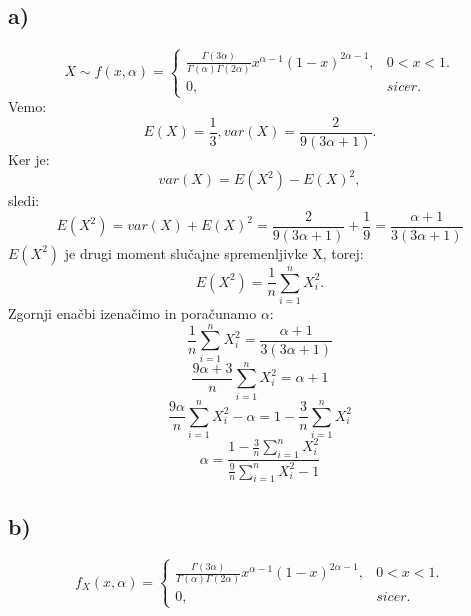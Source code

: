 \documentclass{article}
\begin{document}
\subsection*{a)}
\begin{equation*}
X\sim f(x,\alpha) =\begin{cases}
 \frac{\Gamma(3\alpha)}{\Gamma(\alpha)\Gamma(2\alpha)} x^{\alpha-1}(1-x)^{2\alpha-1}, & 0<x<1.\\
0, & sicer.
\end{cases}
\end{equation*}
Vemo: 
\begin{equation*}
E(X) = \frac{1}{3}, var(X) = \frac{2}{9(3\alpha+1)}.
\end{equation*}
Ker je:
\begin{equation*}
var(X)=E(X^2)-E(X)^2,
\end{equation*}
sledi: 
\begin{equation*}
E(X^2) = var(X) + E(X)^2 = \frac{2}{9(3\alpha+1)} + \frac{1}{9} = 
\frac{\alpha +1}{3(3\alpha+1)}
\end{equation*}
$E(X^2)$ je drugi moment slučajne spremenljivke X, torej:
\begin{equation*}
E(X^2) = \frac{1}{n} \sum_{i=1}^n X_i^2.
\end{equation*}
Zgornji enačbi izenačimo in poračunamo $\alpha$:
\begin{equation*}
 \frac{1}{n} \sum_{i=1}^n X_i^2 = \frac{\alpha +1}{3(3\alpha+1)}
\end{equation*}
\begin{equation*}
\frac{9\alpha+3}{n} \sum_{i=1}^n X_i^2 = \alpha +1
\end{equation*}
\begin{equation*}
\frac{9\alpha}{n} \sum_{i=1}^n X_i^2  - \alpha = 1 - \frac{3}{n}\sum_{i=1}^n X_i^2
\end{equation*}
\begin{equation*}
\alpha = \frac{1 - \frac{3}{n}\sum_{i=1}^n X_i^2}{\frac{9}{n} \sum_{i=1}^n X_i^2  - 1}
\end{equation*}

\subsection*{b)}
\begin{equation*}
 f_X(x,\alpha) =\begin{cases}
 \frac{\Gamma(3\alpha)}{\Gamma(\alpha)\Gamma(2\alpha)} x^{\alpha-1}(1-x)^{2\alpha-1}, & 0<x<1.\\
0, & sicer.
\end{cases}
\end{equation*}
\end{document}
